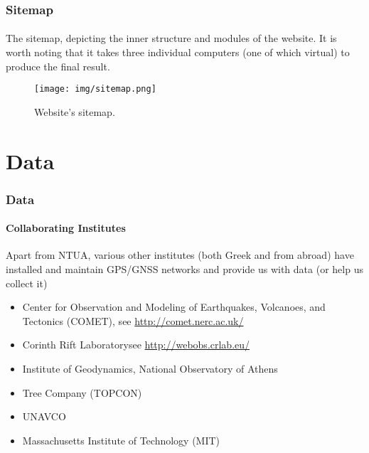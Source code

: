 \documentclass{beamer}
\begin{document}
\begin{frame}\frametitle{Sitemap}\framesubtitle{}

The sitemap, depicting the inner structure and modules of the website. It is worth noting that
it takes three individual computers (one of which virtual) to produce the final result.

    \begin{figure}
        \begin{center}
        \texttt{[image: img/sitemap.png]}
        \caption{Website's sitemap.}
        \label{fig:mits}
        \end{center}
    \end{figure}

\end{frame}

\section{Data}

\begin{frame}\frametitle{Data}\framesubtitle{Collaborating Institutes}

Apart from NTUA, various other institutes (both Greek and from abroad) have installed and maintain
GPS/GNSS networks and provide us with data (or help us collect it)

\begin{itemize}
    \item Center for Observation and Modeling of Earthquakes, Volcanoes, and Tectonics (COMET), see \url{http://comet.nerc.ac.uk/}
    \item Corinth Rift Laboratory\footnotemark see \url{http://webobs.crlab.eu/}
    \item Institute of Geodynamics, National Observatory of Athens
    \item Tree Company (TOPCON)
    \item UNAVCO
    \item Massachusetts Institute of Technology (MIT)
\end{itemize}

\end{frame}
\end{document}
